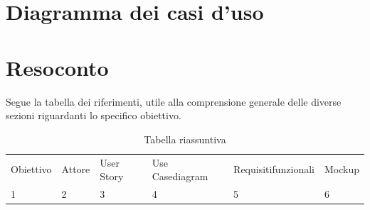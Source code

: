 \documentclass{article}
\begin{document}
\clearpage

\section{Diagramma dei casi d'uso}

\clearpage

\section{Resoconto}

Segue la tabella dei riferimenti, utile alla comprensione generale delle diverse sezioni riguardanti lo specifico obiettivo.\\

\begin{table}[htbp]
    \centering
    \begin{tabularx}{\textwidth}{|X|X|X|X|X|X|}
        \Xhline{2pt} %
        Obiettivo & Attore & User Story & Use Case\newline diagram & Requisiti\newline funzionali & Mockup \\
        \Xhline{2pt} %
        1 & 2 & 3 & 4 & 5 & 6 \\
        \hline
    \end{tabularx}
    \caption{Tabella riassuntiva}
    \label{tab:tabella_tutta_pagina}
\end{table}
\end{document}
